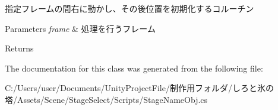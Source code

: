 指定フレームの間右に動かし、その後位置を初期化するコルーチン 


\begin{DoxyParams}{Parameters}
{\em frame} & 処理を行うフレーム\\
\hline
\end{DoxyParams}
\begin{DoxyReturn}{Returns}

\end{DoxyReturn}


The documentation for this class was generated from the following file\+:\begin{DoxyCompactItemize}
\item 
C\+:/\+Users/user/\+Documents/\+Unity\+Project\+File/制作用フォルダ/しろと氷の塔/\+Assets/\+Scene/\+Stage\+Select/\+Scripts/Stage\+Name\+Obj.\+cs\end{DoxyCompactItemize}
